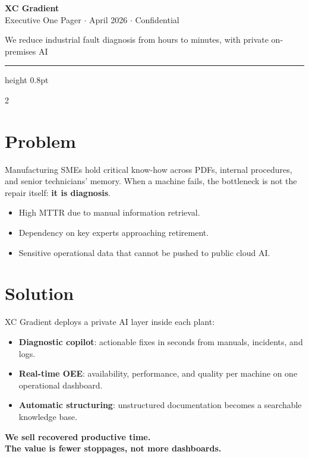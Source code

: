 \documentclass[10pt,a4paper]{article}
\begin{document}
\begin{center}
{\LARGE\bfseries\color{dark} XC Gradient}\\[0.1em]
{\small\color{midgray} Executive One Pager $\cdot$ April 2026 $\cdot$ Confidential}\\[0.35em]
\colorbox{accent}{\color{white}\small\bfseries\strut\quad We reduce industrial fault diagnosis from hours to minutes, with private on-premises AI \quad}
\end{center}

\vspace{0.25em}
{\color{accent}\hrule height 0.8pt}
\vspace{0.35em}

\begin{multicols}{2}

\section{Problem}
Manufacturing SMEs hold critical know-how across PDFs, internal procedures, and senior technicians' memory. When a machine fails, the bottleneck is not the repair itself: \textbf{it is diagnosis}.

\begin{itemize}[leftmargin=1em,itemsep=1pt,topsep=2pt]
\item High MTTR due to manual information retrieval.
\item Dependency on key experts approaching retirement.
\item Sensitive operational data that cannot be pushed to public cloud AI.
\end{itemize}

\section{Solution}
XC Gradient deploys a private AI layer inside each plant:
\begin{itemize}[leftmargin=1em,itemsep=1pt,topsep=2pt]
\item \textbf{Diagnostic copilot}: actionable fixes in seconds from manuals, incidents, and logs.
\item \textbf{Real-time OEE}: availability, performance, and quality per machine on one operational dashboard.
\item \textbf{Automatic structuring}: unstructured documentation becomes a searchable knowledge base.
\end{itemize}

\begin{center}
\colorbox{softgreen}{\parbox{0.94\linewidth}{\centering\small\bfseries
We sell recovered productive time.\\
The value is fewer stoppages, not more dashboards.
}}
\end{center}


\end{multicols}
\end{document}
